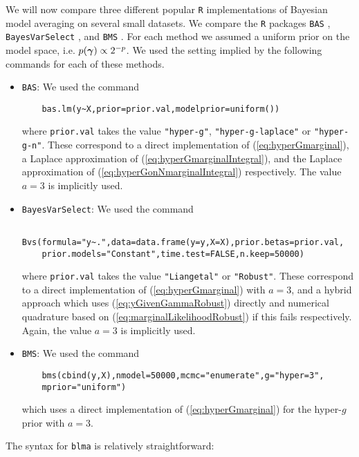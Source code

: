 We will now compare three different popular {\tt R} implementations of Bayesian model averaging on 
several small datasets. We compare the {\tt R} packages {\tt BAS} \citep{Clyde2017}, 
{\tt BayesVarSelect} \citep{Garcia-Donato2016}, and  {\tt BMS} \citep{Zeugner2015}. For each method
we assumed a uniform prior on the model space, i.e. $p({\boldsymbol \gamma})\propto 2^{-p}$. We used the
setting implied by the following commands for each of these methods.
\begin{itemize}
	\item {\tt BAS}: We used the command
	\begin{verbatim}
	bas.lm(y~X,prior=prior.val,modelprior=uniform())
	\end{verbatim}
	
	where \verb|prior.val| takes the value \verb|"hyper-g"|, \verb|"hyper-g-laplace"| or \verb|"hyper-g-n"|.
	These correspond to a direct implementation of (\ref{eq:hyperGmarginal}),
	a Laplace approximation of (\ref{eq:hyperGmarginalIntegral}), and the 
	Laplace approximation of (\ref{eq:hyperGonNmarginalIntegral}) respectively. The
	value $a=3$ is implicitly used.
	
	\item {\tt BayesVarSelect}: We used the command
	\begin{verbatim}
	Bvs(formula="y~.",data=data.frame(y=y,X=X),prior.betas=prior.val,
	prior.models="Constant",time.test=FALSE,n.keep=50000)
	\end{verbatim}
	
	
	\noindent where \verb|prior.val| takes the value \verb|"Liangetal"| or \verb|"Robust"|.
	These 
	correspond to a direct implementation of (\ref{eq:hyperGmarginal}) with $a=3$, and a hybrid approach which
	uses (\ref{eq:yGivenGammaRobust}) directly and numerical quadrature based on (\ref{eq:marginalLikelihoodRobust}) if this fails respectively. 
	Again, the value
	$a=3$ is implicitly used.
	
	\item {\tt BMS}: We used the command
	\begin{verbatim}
	bms(cbind(y,X),nmodel=50000,mcmc="enumerate",g="hyper=3",
	mprior="uniform")	
	\end{verbatim}
	
	\noindent which uses a direct implementation of (\ref{eq:hyperGmarginal}) for the hyper-$g$
	prior with $a=3$.
\end{itemize}

\noindent 
The syntax for {\tt blma} is relatively straightforward:

